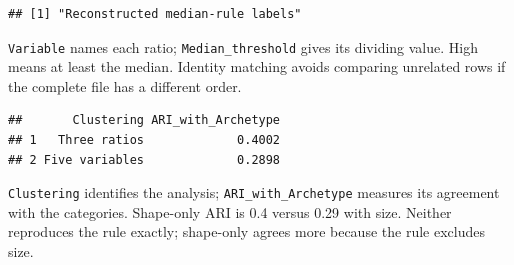 \documentclass[
  10pt,
]{article}
\newenvironment{Shaded}{\begin{snugshade}}{\end{snugshade}}
\newcommand{\AttributeTok}[1]{\textcolor[rgb]{0.13,0.29,0.53}{#1}}
\newcommand{\CommentTok}[1]{\textcolor[rgb]{0.56,0.35,0.01}{\textit{#1}}}
\newcommand{\ConstantTok}[1]{\textcolor[rgb]{0.56,0.35,0.01}{#1}}
\newcommand{\FunctionTok}[1]{\textcolor[rgb]{0.13,0.29,0.53}{\textbf{#1}}}
\newcommand{\NormalTok}[1]{#1}
\newcommand{\OtherTok}[1]{\textcolor[rgb]{0.56,0.35,0.01}{#1}}
\newcommand{\SpecialCharTok}[1]{\textcolor[rgb]{0.81,0.36,0.00}{\textbf{#1}}}
\newcommand{\StringTok}[1]{\textcolor[rgb]{0.31,0.60,0.02}{#1}}
\begin{document}
\begin{verbatim}
## [1] "Reconstructed median-rule labels"
\end{verbatim}

\texttt{Variable} names each ratio; \texttt{Median\_threshold} gives its
dividing value. High means at least the median. Identity matching avoids
comparing unrelated rows if the complete file has a different order.

\begin{Shaded}
\end{Shaded}

\begin{verbatim}
##       Clustering ARI_with_Archetype
## 1   Three ratios             0.4002
## 2 Five variables             0.2898
\end{verbatim}

\texttt{Clustering} identifies the analysis;
\texttt{ARI\_with\_Archetype} measures its agreement with the
categories. Shape-only ARI is 0.4 versus 0.29 with size. Neither
reproduces the rule exactly; shape-only agrees more because the rule
excludes size.
\end{document}
